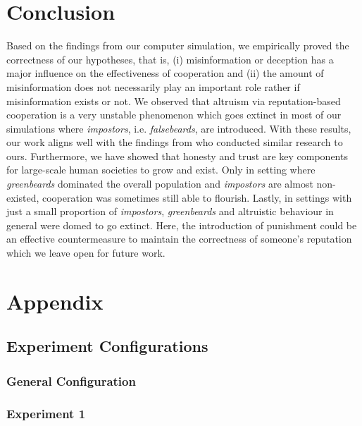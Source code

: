 \documentclass[sigconf]{acmart}
\newcommand{\impostors}{\textit{impostors}\xspace}
\newcommand{\greenbeards}{\textit{greenbeards}\xspace}
\begin{document}
    \section{Conclusion}\label{sec:conclusion}
    Based on the findings from our computer simulation, we empirically proved the correctness of our hypotheses, that is, (i) misinformation or deception has a major influence on the effectiveness of cooperation and (ii) the amount of misinformation does not necessarily play an important role rather if misinformation exists or not.
    We observed that altruism via reputation-based cooperation is a very unstable phenomenon which goes extinct in most of our simulations where \impostors, i.e. \textit{falsebeards}, are introduced.
    With these results, our work aligns well with the findings from \citeauthor{szamado_deception_2016} who conducted similar research to ours.
    Furthermore, we have showed that honesty and trust are key components for large-scale human societies to grow and exist.
    Only in setting where \greenbeards dominated the overall population and \impostors are almost non-existed, cooperation was sometimes still able to flourish.
    Lastly, in settings with just a small proportion of \impostors, \greenbeards and altruistic behaviour in general were domed to go extinct.
    Here, the introduction of punishment could be an effective countermeasure to maintain the correctness of someone's reputation which we leave open for future work.

    
    

    \clearpage

    \onecolumn
    \section*{Appendix}

    \subsection{Experiment Configurations}\label{sec:configs}
    \subsubsection*{General Configuration}
    

    \subsubsection*{Experiment 1}
    
\end{document}
